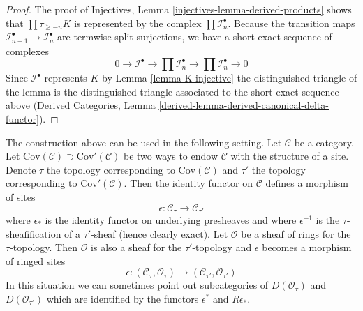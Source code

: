 \begin{proof}
The proof of
Injectives, Lemma \ref{injectives-lemma-derived-products}
shows that $\prod \tau_{\geq -n}K$ is represented by the complex
$\prod \mathcal{I}_n^\bullet$. Because the transition maps
$\mathcal{I}_{n + 1}^\bullet \to \mathcal{I}_n^\bullet$
are termwise split surjections, we have a short exact sequence of
complexes
$$
0 \to \mathcal{I}^\bullet \to
\prod \mathcal{I}_n^\bullet \to \prod \mathcal{I}_n^\bullet \to 0
$$
Since $\mathcal{I}^\bullet$ represents $K$ by
Lemma \ref{lemma-K-injective}
the distinguished triangle of the lemma is the distinguished
triangle associated to the short exact sequence above
(Derived Categories, Lemma
\ref{derived-lemma-derived-canonical-delta-functor}).
\end{proof}



\noindent
The construction above can be used in the following setting.
Let $\mathcal{C}$ be a category. Let
$\text{Cov}(\mathcal{C}) \supset \text{Cov}'(\mathcal{C})$
be two ways to endow $\mathcal{C}$ with the structure of a site.
Denote $\tau$ the topology corresponding to $\text{Cov}(\mathcal{C})$
and $\tau'$ the topology corresponding to $\text{Cov}'(\mathcal{C})$.
Then the identity functor on $\mathcal{C}$ defines a morphism
of sites
$$
\epsilon : \mathcal{C}_\tau \longrightarrow \mathcal{C}_{\tau'}
$$
where $\epsilon_*$ is the identity functor on underlying presheaves and
where $\epsilon^{-1}$ is the $\tau$-sheafification of a $\tau'$-sheaf
(hence clearly exact). Let $\mathcal{O}$ be a sheaf of rings for the
$\tau$-topology. Then $\mathcal{O}$ is also a sheaf for the $\tau'$-topology
and $\epsilon$ becomes a morphism of ringed sites
$$
\epsilon :
(\mathcal{C}_\tau, \mathcal{O}_\tau)
\longrightarrow
(\mathcal{C}_{\tau'}, \mathcal{O}_{\tau'})
$$
In this situation we can sometimes point out subcategories of
$D(\mathcal{O}_\tau)$ and $D(\mathcal{O}_{\tau'})$ which are
identified by the functors $\epsilon^*$ and $R\epsilon_*$.

